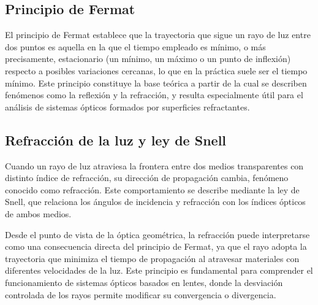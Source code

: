\subsection{Principio de Fermat}\label{sec:fermat}
El principio de Fermat establece que la trayectoria que sigue un rayo de luz entre dos puntos es aquella en la que el tiempo empleado es mínimo, o más precisamente, estacionario (un mínimo, un máximo o un punto de inflexión) respecto a posibles variaciones cercanas, lo que en la práctica suele ser el tiempo mínimo. Este principio constituye la base teórica a partir de la cual se describen fenómenos como la reflexión y la refracción, y resulta especialmente útil para el análisis de sistemas ópticos formados por superficies refractantes.

\subsection{Refracción de la luz y ley de Snell}
Cuando un rayo de luz atraviesa la frontera entre dos medios transparentes con distinto índice de refracción, su dirección de propagación cambia, fenómeno conocido como refracción. Este comportamiento se describe mediante la ley de Snell, que relaciona los ángulos de incidencia y refracción con los índices ópticos de ambos medios.

Desde el punto de vista de la óptica geométrica, la refracción puede interpretarse como una consecuencia directa del principio de Fermat, ya que el rayo adopta la trayectoria que minimiza el tiempo de propagación al atravesar materiales con diferentes velocidades de la luz. Este principio es fundamental para comprender el funcionamiento de sistemas ópticos basados en lentes, donde la desviación controlada de los rayos permite modificar su convergencia o divergencia.

%		
%		
%
%

